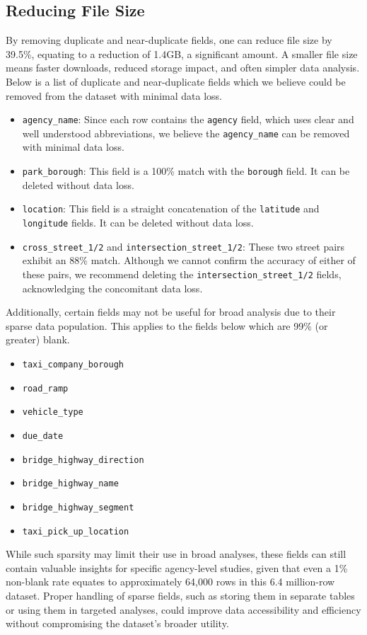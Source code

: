 \documentclass[linenumber]{jdsart}
\begin{document}
\subsection{Reducing File Size}
\label{sec:filesize}
By removing duplicate and near-duplicate fields, one can reduce file size by 39.5\%, 
equating to a reduction of 1.4GB, a significant amount. A smaller file size 
means faster downloads, reduced storage impact, and often simpler data analysis. 
Below is a list of duplicate and near-duplicate fields which we believe could be
removed from the dataset with minimal data loss. 

\begin{itemize}[left=1.5em]
    \item \texttt{agency\_name}: Since each row contains the \texttt{agency} 
    field, which uses clear and well understood abbreviations, we believe the
    \texttt{agency\_name} can be removed with minimal data loss.
    
    \item \texttt{park\_borough}: This field is a 100\% match with 
    the \texttt{borough} field. It can be deleted without data loss.
    
    \item \texttt{location}: This field is a straight concatenation of 
    the \texttt{latitude} and \texttt{longitude} fields. It can be 
    deleted without data loss.
     
    \item \texttt{cross\_street\_1/2} and \texttt{intersection\_street\_1/2}: 
    These two street pairs exhibit an 88\% match. Although we cannot 
    confirm the accuracy of either of these pairs, we recommend deleting the 
    \texttt{intersection\_street\_1/2} fields, acknowledging 
    the concomitant data loss.
\end{itemize}


Additionally, certain fields may not be useful for broad analysis
due to their sparse data population. This applies to the fields 
below which are 99\% (or greater) blank. 
\begin{itemize}[left=1.5em]
    \item \texttt{taxi\_company\_borough}
    \item \texttt{road\_ramp}
    \item \texttt{vehicle\_type}
    \item \texttt{due\_date}
    \item \texttt{bridge\_highway\_direction}
    \item \texttt{bridge\_highway\_name}
    \item \texttt{bridge\_highway\_segment}
    \item \texttt{taxi\_pick\_up\_location}
\end{itemize}
While such sparsity may limit their use in 
broad analyses, these fields can still contain valuable insights 
for specific agency-level studies, given that even a 1\% 
non-blank rate equates to approximately 64,000 rows in this 
6.4 million-row dataset. Proper handling of sparse fields, 
such as storing them in separate tables or using them in 
targeted analyses, could improve data accessibility and 
efficiency without compromising the dataset’s broader utility.
\end{document}

